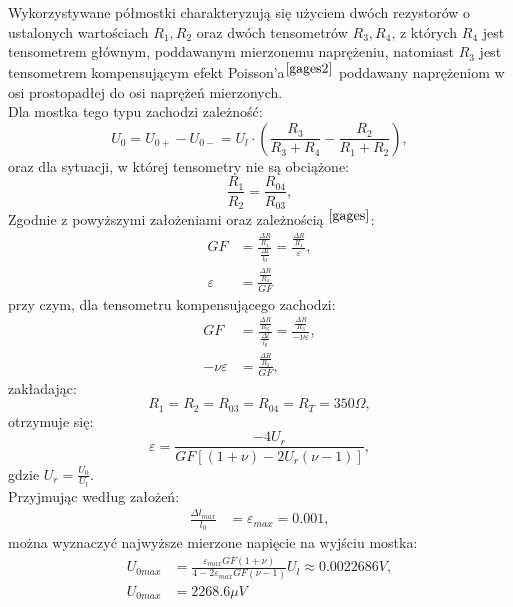 \documentclass[12pt]{article}
\begin{document}
	Wykorzystywane półmostki charakteryzują się użyciem dwóch rezystorów o ustalonych wartościach $R_1, R_2$ oraz dwóch tensometrów $R_3, R_4$, z których $R_4$ jest tensometrem głównym, poddawanym mierzonemu naprężeniu, natomiast $R_3$ jest tensometrem kompensującym efekt Poisson'a$^{\cite{gages2}}$ poddawany naprężeniom w osi prostopadłej do osi naprężeń mierzonych.\\
	Dla mostka tego typu zachodzi zależność:
	\begin{equation}
		U_0 = U_{0+} - U_{0-} = U_l \cdot \left(\frac{R_3}{R_3+R_4}- \frac{R_2}{R_1+R_2}\right),
	\end{equation}
	oraz dla sytuacji, w której tensometry nie są obciążone:
	\begin{equation}
		\frac{R_1}{R_2}=\frac{R_{04}}{R_{03}},
	\end{equation}
	Zgodnie z powyższymi założeniami oraz zależnością $^{\cite{gages}}$:
	\begin{align*}
		GF&=\frac{\frac{\Delta R}{R_4}}{\frac{\Delta l}{l_0}}=\frac{\frac{\Delta R}{R_4}}{\varepsilon},\\
		\varepsilon &= \frac{\frac{\Delta R}{R_4}}{GF}
	\end{align*}
	przy czym, dla tensometru kompensującego zachodzi:
	\begin{align*}
		GF&=\frac{\frac{\Delta R}{R_3}}{\frac{\Delta l}{l_0}}=\frac{\frac{\Delta R}{R_3}}{-\nu \varepsilon},\\
		-\nu \varepsilon &= \frac{\frac{\Delta R}{R_3}}{GF},
	\end{align*}
	zakładając:
	\begin{equation}
		R_1 = R_2 = R_{03} = R_{04} = R_T = 350\Omega,
	\end{equation}
	otrzymuje się:
	\begin{equation}
		\varepsilon = \frac{-4U_r}{GF[(1+\nu)-2U_r(\nu-1)]},
	\end{equation}
	gdzie $U_r = \frac{U_0}{U_l}$.\\
	Przyjmując według założeń:
	\begin{align}
		\frac{\Delta l_{max}}{l_0} &= \varepsilon_{max} = 0.001,
	\end{align}
	można wyznaczyć najwyższe mierzone napięcie na wyjściu mostka:
	\begin{align}
		U_{0max} &= \frac{\varepsilon_{max}GF(1+\nu)}{4-2\varepsilon_{max} GF(\nu-1)}U_l \approx 0.0022686V,\\
		U_{0max} &= 2268.6\mu V
	\end{align}
	
\end{document}
